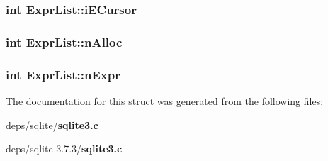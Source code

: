 \subsubsection{\setlength{\rightskip}{0pt plus 5cm}int \bf{Expr\-List::i\-ECursor}}\label{structExprList_883124d0129ac5a3a95dc88e500ac3ee}


\subsubsection{\setlength{\rightskip}{0pt plus 5cm}int \bf{Expr\-List::n\-Alloc}}\label{structExprList_28c140d9b7c24561e079808ad0d11d82}


\subsubsection{\setlength{\rightskip}{0pt plus 5cm}int \bf{Expr\-List::n\-Expr}}\label{structExprList_68d86c13a3ce59102b4cb408d10954a6}




The documentation for this struct was generated from the following files:\begin{CompactItemize}
\item 
deps/sqlite/\bf{sqlite3.c}\item 
deps/sqlite-3.7.3/\bf{sqlite3.c}\end{CompactItemize}
